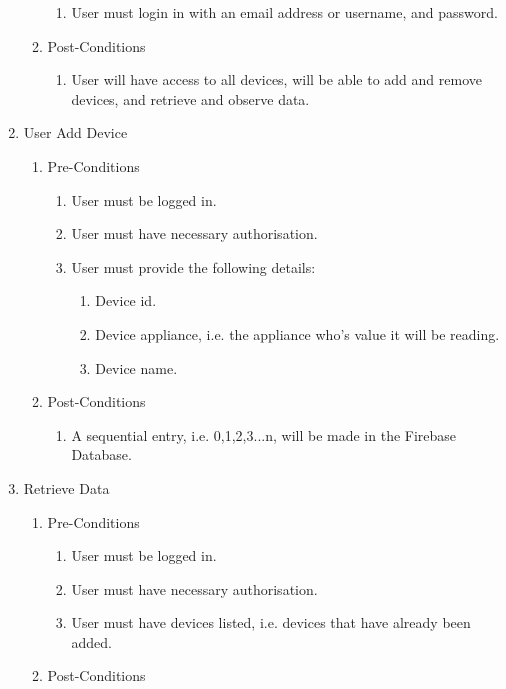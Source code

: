 \documentclass{article}
\begin{document}
\begin{enumerate}
\begin{enumerate}
\begin{enumerate}
				\item	User must login in with an email address or username, and password.
			\end{enumerate}
			\item  Post-Conditions		
			\begin{enumerate}
				\item	User will have access to all devices, will be able to add and remove devices, and retrieve and observe data.
			\end{enumerate}
		\end{enumerate}
		\item	User Add Device
		\begin{enumerate}
			\item  Pre-Conditions
			\begin{enumerate}
				\item	User must be logged in.
				\item	User must have necessary authorisation.
				\item	User must provide the following details:
				\begin{enumerate}
					\item	Device id.
					\item	Device appliance, i.e. the appliance who's value it will be reading.
					\item	Device name.
				\end{enumerate}
			\end{enumerate}
			\item  Post-Conditions		
			\begin{enumerate}
				\item	A sequential entry, i.e. 0,1,2,3...n, will be made in the Firebase Database.
			\end{enumerate}
		\end{enumerate}
		\item	Retrieve Data
		\begin{enumerate}
			\item  Pre-Conditions
			\begin{enumerate}
				\item	User must be logged in.
				\item	User must have necessary authorisation.
				\item	User must have devices listed, i.e. devices that have already been added.
			\end{enumerate}
			\item  Post-Conditions		
			\begin{enumerate}

\end{enumerate}
\end{enumerate}
\end{enumerate}
\end{document}
